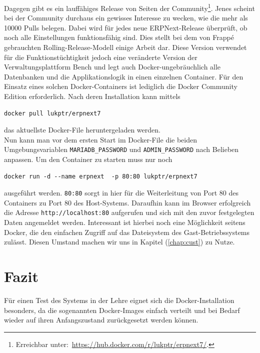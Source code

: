 Dagegen gibt es ein lauffähiges Release von Seiten der Community\footnote{Erreichbar unter:\ \url{https://hub.docker.com/r/lukptr/erpnext7/}.}. Jenes scheint bei der Community durchaus ein gewisses Interesse zu wecken, wie die mehr als 10000 Pulls belegen. Dabei wird für jedes neue ERPNext-Release überprüft, ob noch alle Einstellungen funktionsfähig sind. Dies stellt bei dem von Frappé gebrauchten Rolling-Release-Modell einige Arbeit dar. Diese Version verwendet für die Funktionstüchtigkeit jedoch eine veränderte Version der Verwaltungsplattform Bench und legt auch Docker-ungebräuchlich alle Datenbanken und die Applikationslogik in einen einzelnen Container.
Für den Einsatz eines solchen Docker-Containers ist lediglich die Docker Community Edition erforderlich. Nach deren Installation kann mittels 
\begin{verbatim}
docker pull lukptr/erpnext7
\end{verbatim}
das aktuellste Docker-File heruntergeladen werden.\\
Nun kann man vor dem ersten Start im Docker-File die beiden Umgebungsvariablen \texttt{MARIADB\_PASSWORD} und \texttt{ADMIN\_PASSWORD} nach Belieben anpassen.
Um den Container zu starten muss nur noch 
\begin{verbatim}
docker run -d --name erpnext  -p 80:80 lukptr/erpnext7
\end{verbatim}
ausgeführt werden. \texttt{80:80} sorgt in hier für die Weiterleitung von Port 80 des Containers zu Port 80 des Host-Systems. Daraufhin kann im Browser erfolgreich die Adresse \texttt{http://localhost:80} aufgerufen und sich mit den zuvor festgelegten Daten angemeldet werden.
Interessant ist hierbei noch eine Möglichkeit seitens Docker, die den einfachen Zugriff auf das Dateisystem des Gast-Betriebssystems zulässt. Diesen Umstand machen wir uns in Kapitel (\ref{chap:cust}) zu Nutze.
\section{Fazit}
Für einen Test des Systems in der Lehre eignet sich die Docker-Installation besonders, da die sogenannten Docker-Images einfach verteilt und bei Bedarf wieder auf ihren Anfangszustand zurückgesetzt werden können.